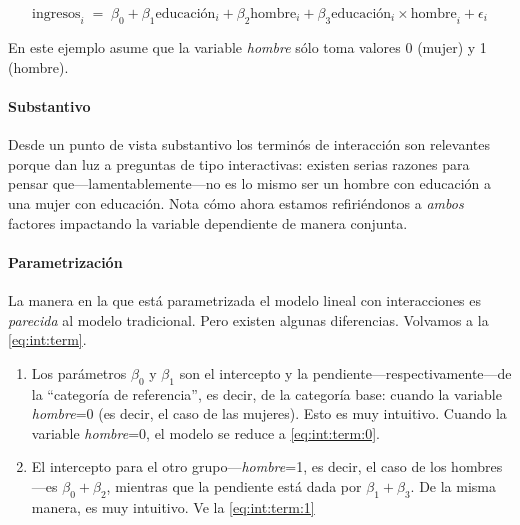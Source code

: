 \documentclass[onesided]{article}\usepackage[]{graphicx}\usepackage[]{color}
\begin{document}
    \begin{equation}\label{eq:int:term}
      \text{ingresos}_{i} \;=\; \beta_{0} + \beta_{1}\text{educaci\'on}_{i} + \beta_{2}\text{hombre}_{i} + \beta_{3}{\text{educaci\'on}_{i} \times \text{hombre}}_{i}  + \epsilon_{i}
    \end{equation}

En este ejemplo asume que la variable \emph{hombre} s\'olo toma valores 0 (mujer) y 1 (hombre). 

\paragraph{Substantivo} Desde un punto de vista substantivo los termin\'os de interacci\'on son relevantes porque dan luz a preguntas de tipo interactivas: existen serias razones para pensar que---lamentablemente---no es lo mismo ser un hombre con educaci\'on a una mujer con educaci\'on. Nota c\'omo ahora estamos refiri\'endonos a \emph{ambos} factores impactando la variable dependiente de manera conjunta.

\paragraph{Parametrizaci\'on} La manera en la que est\'a parametrizada el modelo lineal con interacciones es \emph{parecida} al modelo tradicional. Pero existen algunas diferencias. Volvamos a la \autoref{eq:int:term}.

\begin{enumerate}
  \item Los par\'ametros $\beta_{0}$ y $\beta_{1}$ son el intercepto y la pendiente---respectivamente---de la ``categor\'ia de referencia'', es decir, de la categor\'ia base: cuando la variable \emph{hombre}=0 (es decir, el caso de las mujeres). Esto es muy intuitivo. Cuando la variable \emph{hombre}=0, el modelo se reduce a \autoref{eq:int:term:0}.
  \item El intercepto para el otro grupo---\emph{hombre}=1, es decir, el caso de los hombres---es $\beta_{0}+\beta_{2}$, mientras que la pendiente est\'a dada por $\beta_{1}+\beta_{3}$. De la misma manera, es muy intuitivo. Ve la \autoref{eq:int:term:1}
\end{enumerate}
\end{document}
